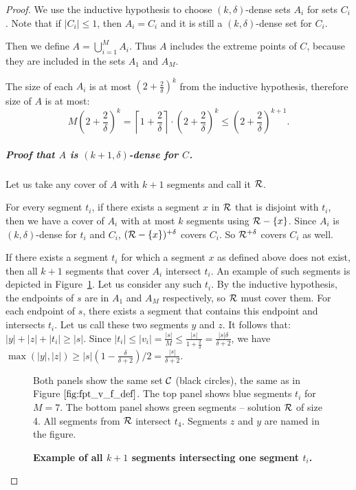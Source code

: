 \begin{proof}
We use the inductive hypothesis to choose $(k, \delta)$-dense sets $A_i$
for sets $C_i$. Note that if $|C_i| \le 1$, then $A_i = C_i$
and it is still a $(k, \delta)$-dense set for $C_i$.

Then we define $A = \bigcup_{i=1}^{M} A_i$.
Thus $A$ includes the extreme points of $C$,
because they are included in the sets $A_1$ and $A_M$.

The size of each $A_i$ is at most $(2+\frac{2}{\delta})^{k}$
from the inductive hypothesis, therefore size of $A$ is at most:
$$M\left(2+\frac{2}{\delta}\right)^{k} =
\left\lceil1+\frac{2}{\delta}\right\rceil\cdot\left(2+\frac{2}{\delta}\right)^{k}
\le \left(2+\frac{2}{\delta}\right)^{k+1}.$$


\subparagraph{Proof that $A$ is $(k+1, \delta)$-dense for $C$.}
Let us take any cover of $A$ with $k+1$ segments and call it $\mathcal{R}$.

For every segment $t_i$, if there exists a segment $x$ in $\mathcal{R}$ 
that is disjoint with $t_i$,
then we have a cover of $A_i$ with at most $k$
segments using $\mathcal{R} - \{x\}$.
Since $A_i$ is $(k, \delta)$-dense for $t_i$ and $C_i$,
$(\mathcal{R} - \{x\})^{+\delta}$ covers $C_i$.
So $\mathcal{R}^{+\delta}$ covers $C_i$ as well.

If there exists a segment $t_i$ for which a segment $x$ as defined above
does not exist, then all $k+1$ segments that cover
$A_i$ intersect $t_i$.
An example of such segments is depicted in Figure~\ref{fig:fpt_tricky_case}.
Let us consider any such $t_i$.
By the inductive hypothesis, the endpoints of $s$ are
in $A_1$ and $A_M$ respectively, so $\mathcal{R}$ must cover them.
For each endpoint of $s$, there exists
a segment that contains this endpoint and intersects $t_i$.
Let us call these two segments $y$ and $z$. It follows that:
$|y| + |z| + |t_i| \ge |s|$.
Since $|t_i| \le |v_i| = \frac{|s|}{M} \le \frac{|s|}{1+\frac{2}{\delta}} = \frac{|s|\delta}{\delta+2}$,
we have $\max(|y|, |z|) \ge |s|(1-\frac{\delta}{\delta+2})/2 = \frac{|s|}{\delta+2}$.

\begin{figure}[h]
\begin{center}
\def\svgwidth{\columnwidth}

\end{center}
\caption{\textbf{Example of all $k+1$ segments intersecting one segment $t_i$.}}
Both panels show the same set $\mathcal{C}$ (black circles),
the same as in Figure $\ref{fig:fpt_v_f_def}$.
The top panel shows blue segments $t_i$ for $M=7$.
The bottom panel shows green segments -- solution $\mathcal{R}$ of size 4.
All segments from $\mathcal{R}$ intersect $t_4$.
Segments $z$ and $y$ are named in the figure.
\label{fig:fpt_tricky_case}
\end{figure}


\end{proof}
